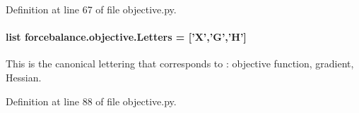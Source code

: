 Definition at line 67 of file objective.\-py.

\hypertarget{namespaceforcebalance_1_1objective_a89a971322532b36852765b2680651f1f}{
\paragraph[{Letters}]{\setlength{\rightskip}{0pt plus 5cm}list forcebalance.\-objective.\-Letters = \mbox{[}'X','G','H'\mbox{]}}}\label{namespaceforcebalance_1_1objective_a89a971322532b36852765b2680651f1f}


This is the canonical lettering that corresponds to \-: objective function, gradient, Hessian. 



Definition at line 88 of file objective.\-py.

